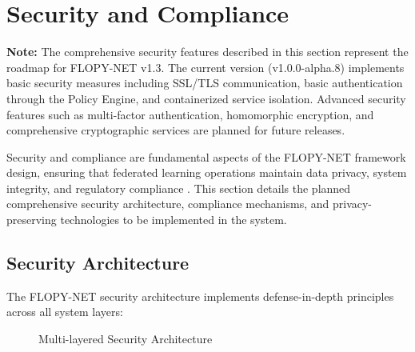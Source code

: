 \section{Security and Compliance}
\label{sec:security-compliance}

\textbf{Note:} The comprehensive security features described in this section represent the roadmap for FLOPY-NET v1.3. The current version (v1.0.0-alpha.8) implements basic security measures including SSL/TLS communication, basic authentication through the Policy Engine, and containerized service isolation. Advanced security features such as multi-factor authentication, homomorphic encryption, and comprehensive cryptographic services are planned for future releases.

Security and compliance are fundamental aspects of the FLOPY-NET framework design, ensuring that federated learning operations maintain data privacy, system integrity, and regulatory compliance \cite{mothukuri2021survey}. This section details the planned comprehensive security architecture, compliance mechanisms, and privacy-preserving technologies to be implemented in the system.

\subsection{Security Architecture}

The FLOPY-NET security architecture implements defense-in-depth principles across all system layers:

\begin{figure}[htbp]
\centering
{}
\caption{Multi-layered Security Architecture}
\label{fig:security-arch}
\end{figure}

